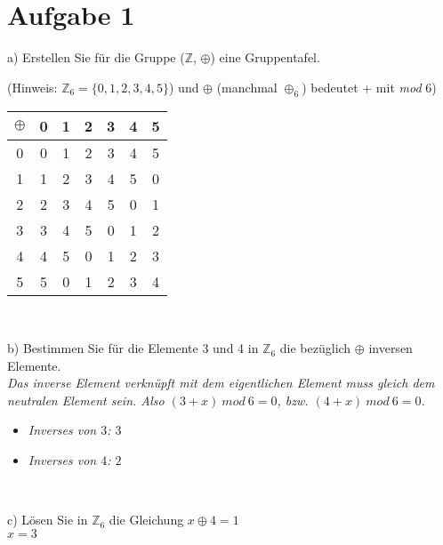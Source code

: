 \section*{Aufgabe 1}

a) Erstellen Sie für die Gruppe ($\mathbb{Z}$, $\oplus$) eine Gruppentafel.\

\hspace{0.5cm}(Hinweis: $\mathbb{Z}_6 = \{ 0,1,2,3,4,5 \}$) und $\oplus$ (manchmal $\oplus _6$) bedeutet + mit \textit{mod} 6)\\

\begin{table}[h]
\centering
\begin{tabular}{c|c|c|c|c|c|c}
$\oplus$ & 0 & 1 & 2 & 3 & 4 & 5\\
\hline
0 & 0 & 1 & 2 & 3 & 4 & 5\\
\hline
1 & 1 & 2 & 3 & 4 & 5 & 0\\
\hline
2 & 2 & 3 & 4 & 5 & 0 & 1\\
\hline
3 & 3 & 4 & 5 & 0 & 1 & 2\\
\hline
4 & 4 & 5 & 0 & 1 & 2 & 3\\
\hline
5 & 5 & 0 & 1 & 2 & 3 & 4\\
\end{tabular}
\end{table}\

b) Bestimmen Sie für die Elemente 3 und 4 in $\mathbb{Z}_6$ die bezüglich $\oplus$ inversen Elemente.\\

\textit{Das inverse Element verknüpft mit dem eigentlichen Element muss gleich dem neutralen Element sein. Also $(3 + x) \ mod \ 6 = 0$, bzw. $(4 + x) \ mod \ 6 = 0$.}

\begin{itemize}[leftmargin=*]
\item \textit{Inverses von $3$: $3$}
\item \textit{Inverses von $4$: $2$}
\end{itemize}\

c) Lösen Sie in $\mathbb{Z}_6$ die Gleichung $x \oplus 4 = 1$\\

$x = 3$

\newpage